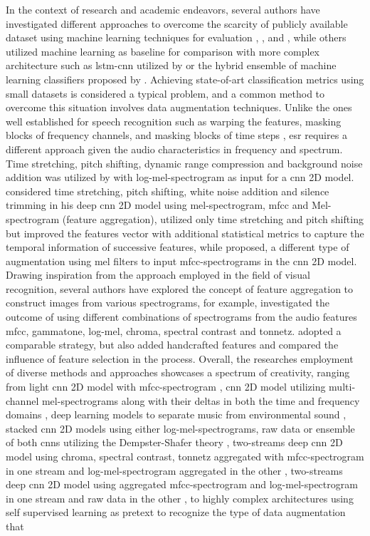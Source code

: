 In the context of research and academic endeavors, several authors have investigated different approaches to overcome the scarcity of publicly available dataset using machine learning techniques for evaluation  \cite{Salamon2014}, \cite{Bountourakis2015}, and \cite{Piczak2015}, while others utilized machine learning as baseline for comparison with more complex architecture such as \gls{lstm}-\gls{cnn} utilized by \textcite{Pandya2021} or the hybrid ensemble of machine learning classifiers proposed by \textcite{Bansal2022}. Achieving state-of-art classification metrics using small datasets is considered a typical problem, and a common method to overcome this situation involves data augmentation techniques. Unlike the ones well established for speech recognition such as warping the features, masking blocks of frequency channels, and masking blocks of time steps \cite{Park2019}, \gls{esr} requires a different approach given the audio characteristics in frequency and spectrum. Time stretching, pitch shifting, dynamic range compression and background noise addition was utilized by \textcite{Salamon2017} with log-mel-spectrogram as input for a \gls{cnn} 2D model. \textcite{Mushtaq2020a} considered time stretching, pitch shifting, white noise addition and silence trimming in his deep \gls{cnn} 2D model using mel-spectrogram, \gls{mfcc} and Mel-spectrogram (feature aggregation), \textcite{Bountourakis2019} utilized only time stretching and pitch shifting but improved the features vector with additional statistical metrics to capture the temporal information of successive features, while \textcite{Chu2023} proposed, a different type of augmentation using mel filters to input \gls{mfcc}-spectrograms in the \gls{cnn} 2D model. Drawing inspiration from the approach employed in the field of visual recognition, several authors have explored the concept of feature aggregation to construct images from various spectrograms, for example, \textcite{Su2020} investigated the outcome of using different combinations of spectrograms from the audio features \gls{mfcc}, gammatone, log-mel, chroma, spectral contrast and tonnetz. \textcite{Luz2021} adopted a comparable strategy, but also added handcrafted features and compared the influence of feature selection in the process. Overall, the researches employment of diverse methods and approaches showcases a spectrum of creativity, ranging from light \gls{cnn} 2D model with \gls{mfcc}-spectrogram \cite{Shreyas2020}, \gls{cnn} 2D model utilizing multi-channel mel-spectrograms along with their deltas in both the time and frequency domains \cite{Tang2018}, deep learning models to separate music from environmental sound \cite{Rothmund2018}, stacked \gls{cnn} 2D models using either log-mel-spectrograms, raw data or ensemble of both \gls{cnn}s utilizing the Dempster-Shafer theory \cite{Li2018}, two-streams deep \gls{cnn} 2D model using chroma, spectral contrast, tonnetz aggregated with \gls{mfcc}-spectrogram in one stream and log-mel-spectrogram aggregated in the other \cite{Su2019}, two-streams deep \gls{cnn} 2D model using aggregated \gls{mfcc}-spectrogram and log-mel-spectrogram in one stream and raw data in the other \cite{Tran2020}, to highly complex architectures using self supervised learning as pretext to recognize the type of data augmentation that 